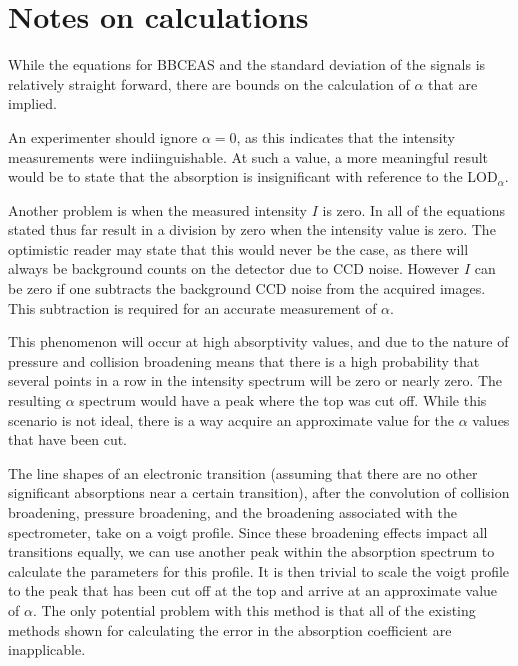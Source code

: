\section{Notes on calculations}\label{sec:ceas_eq_notes}

While the equations for \ac{BBCEAS} and the standard deviation of the signals
is relatively straight forward, there are bounds on the calculation of
$\alpha$ that are implied.

An experimenter should ignore $\alpha = 0$, as this indicates that the
intensity measurements were indiinguishable. At such a value, a more meaningful
result would be to state that the absorption is insignificant with reference to
the LOD$_{\alpha}$.

Another problem is when the measured intensity $I$ is zero. In all of the
equations stated thus far result in a division by zero when the intensity
value is zero. The optimistic reader may state that this would never be
the case, as there will always be background counts on the detector due to
\ac{CCD} noise. However $I$ can be zero if one subtracts the background
\ac{CCD} noise from the acquired images. This subtraction is required for an
accurate measurement of $\alpha$.

This phenomenon will occur at high absorptivity values, and due to the nature
of pressure and collision broadening means that there is a high probability
that several points in a row in the intensity spectrum will be zero or nearly
zero. The resulting $\alpha$ spectrum would have a peak where the top was cut
off. While this scenario is not ideal, there is a way acquire an approximate
value for the $\alpha$ values that have been cut.

The line shapes of an electronic transition (assuming that there are no other
significant absorptions near a certain transition), after the convolution of
collision broadening, pressure broadening, and the broadening associated with
the spectrometer, take on a voigt profile. Since these broadening effects
impact all transitions equally, we can use another peak within the absorption
spectrum to calculate the parameters for this profile. It is then trivial to
scale the voigt profile to the peak that has been cut off at the top and
arrive at an approximate value of $\alpha$. The only potential problem with
this method is that all of the existing methods shown for calculating the
error in the absorption coefficient are inapplicable.
